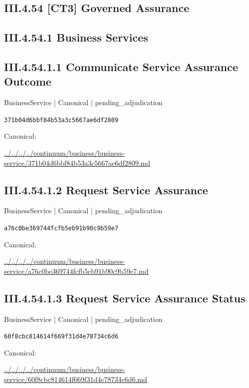 \documentclass[10pt,a4paper]{article}
\begin{document}
\subsection*{III.4.54 [CT3] Governed Assurance}
\subsection*{III.4.54.1 Business Services}
\subsection*{III.4.54.1.1 Communicate Service Assurance Outcome}
{\small BusinessService | Canonical | pending\_adjudication}\par
\texttt{371b04d6bbf84b53a3c5667ae6df2809}\par
Canonical: \par
{\footnotesize\url{../../../../continuum/business/business-service/371b04d6bbf84b53a3c5667ae6df2809.md}}\par
\subsection*{III.4.54.1.2 Request Service Assurance}
{\small BusinessService | Canonical | pending\_adjudication}\par
\texttt{a76c0be369744fcfb5eb91b90c9b59e7}\par
Canonical: \par
{\footnotesize\url{../../../../continuum/business/business-service/a76c0be369744fcfb5eb91b90c9b59e7.md}}\par
\subsection*{III.4.54.1.3 Request Service Assurance Status}
{\small BusinessService | Canonical | pending\_adjudication}\par
\texttt{60f8cbc814614f669f31d4e78734c6d6}\par
Canonical: \par
{\footnotesize\url{../../../../continuum/business/business-service/60f8cbc814614f669f31d4e78734c6d6.md}}\par
\end{document}
